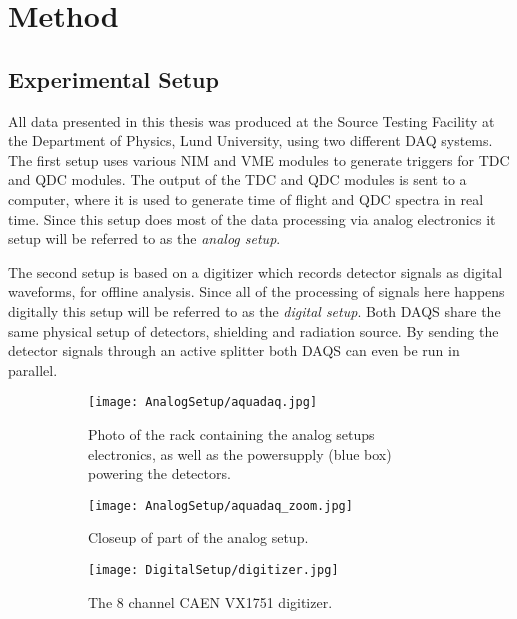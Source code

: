 \documentclass[main.tex]{subfiles}
\begin{document}
\chapter{Method}
\section{Experimental Setup}
All data presented in this thesis was produced at the Source Testing Facility at the Department of Physics, Lund University, using two different DAQ systems. The first setup uses various NIM and VME modules to generate triggers for TDC and QDC modules. The output of the TDC and QDC modules is sent to a computer, where it is used to generate time of flight and QDC spectra in real time. Since this setup does most of the data processing via analog electronics it setup will be referred to as the \textit{analog setup}. 

The second setup is based on a digitizer which records detector signals as digital waveforms, for offline analysis. Since all of the processing of signals here happens digitally this setup will be referred to as the \textit{digital setup}. 
Both DAQS share the same physical setup of detectors, shielding and radiation source. By sending the detector signals through an active splitter both DAQS can even be run in parallel.


\begin{figure}[ht]
	\begin{subfigure}[b]{0.5\textwidth}
	    \centering
			\captionsetup{width=.80\linewidth}	
    	    \texttt{[image: AnalogSetup/aquadaq.jpg]}
        	\caption[Photograph of analog DAQ electronics]{Photo of the rack containing the analog setups electronics, as well as the powersupply (blue box) powering the detectors.}
	    \label{fig:aquadaq_image} 
	\end{subfigure}
	\begin{subfigure}[b]{0.24\textwidth}
	    \centering
	    	\captionsetup{width=1\linewidth}	
    	    \texttt{[image: AnalogSetup/aquadaq\_zoom.jpg]}
        	\caption[Photograph of analog VME modules]{Closeup of part of the analog setup.}
	    \label{fig:aquadaq_zoom_image} 
	\end{subfigure}
	\begin{subfigure}[b]{0.24\textwidth}
    	\centering
			\captionsetup{width=.6\linewidth}	
        	\texttt{[image: DigitalSetup/digitizer.jpg]}
        	\caption[Photograph of the CAEN VX1751 digitizer]{The 8 channel CAEN VX1751 digitizer.}
    	\label{fig:digitizer_image} 
    \end{subfigure}
    \caption[Photograps of the analog DAQ setup and the digitizer.]{}
\end{figure}
\end{document}
